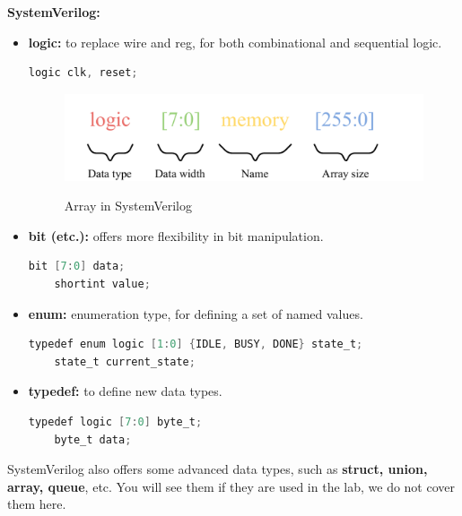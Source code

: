 \documentclass{article}
\begin{document}
\textbf{SystemVerilog:}
\begin{itemize}
    \item \textbf{logic:} to replace wire and reg, for both combinational and sequential logic.
    \begin{lstlisting}[language=Verilog,frame=single,backgroundcolor=\color{White},basicstyle=\color{LightGreen},showspaces=false,showstringspaces=false]
        logic clk, reset;
    \end{lstlisting}

    \begin{figure}[h]
        \centering
        \includegraphics[width=\textwidth]{figures/array.pdf}
        \label{fig:array}
        \caption{Array in SystemVerilog}
    \end{figure}
    \item \textbf{bit (etc.):} offers more flexibility in bit manipulation.
    \begin{lstlisting}[language=Verilog,frame=single,backgroundcolor=\color{White},basicstyle=\color{LightGreen},showspaces=false,showstringspaces=false]
    bit [7:0] data;
    shortint value;
    \end{lstlisting}
    \item \textbf{enum:} enumeration type, for defining a set of named values.
    \begin{lstlisting}[language=Verilog,frame=single,backgroundcolor=\color{White},basicstyle=\color{LightGreen},showspaces=false,showstringspaces=false]
    typedef enum logic [1:0] {IDLE, BUSY, DONE} state_t;
    state_t current_state;
    \end{lstlisting}
    \item \textbf{typedef:} to define new data types.
    \begin{lstlisting}[language=Verilog,frame=single,backgroundcolor=\color{White},basicstyle=\color{LightGreen},showspaces=false,showstringspaces=false]
    typedef logic [7:0] byte_t;
    byte_t data;
    \end{lstlisting}
\end{itemize}
SystemVerilog also offers some advanced data types, such as \textbf{struct, union, array, queue}, etc. You will see them if they are used in the lab, we do not cover them here.\\
\end{document}
